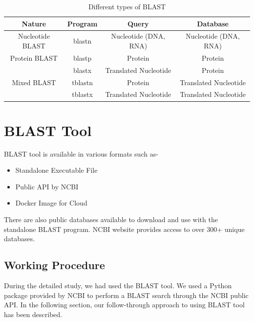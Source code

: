 \documentclass[12pt, a4paper]{report}
\begin{document}
\begin{table}[H]
    \centering
    \begin{tabular}{| c | c | c | c |}
        \hline
        
        Nature              & Program   & Query     & Database  \\ 
        \hline
        Nucleotide BLAST    & blastn    & Nucleotide (DNA, RNA) & Nucleotide (DNA, RNA) \\
        \hline
        Protein BLAST       & blastp    & Protein   & Protein   \\
        \hline
        \multirow{3}{*}{Mixed BLAST}    & blastx    & Translated Nucleotide & Protein \\
        \cline{2-4}
                 & tblastn   & Protein   & Translated Nucleotide \\
        \cline{2-4}
                 & tblastx   & Translated Nucleotide & Translated Nucleotide \\
        \hline
    \end{tabular}
    \caption{Different types of BLAST}
\end{table}

\chapter{BLAST Tool}

BLAST tool is available in various formats such as-
\begin{itemize}
    \item Standalone Executable File
    \item Public API by NCBI
    \item Docker Image for Cloud
\end{itemize}

There are also public databases available to download and use with the standalone BLAST program. NCBI website provides access to over 300+ unique databases. 

\section{Working Procedure}
During the detailed study, we had used the BLAST tool. We used a Python package provided by NCBI to perform a BLAST search through the NCBI public API. In the following section, our follow-through approach to using BLAST tool has been described.
\end{document}
